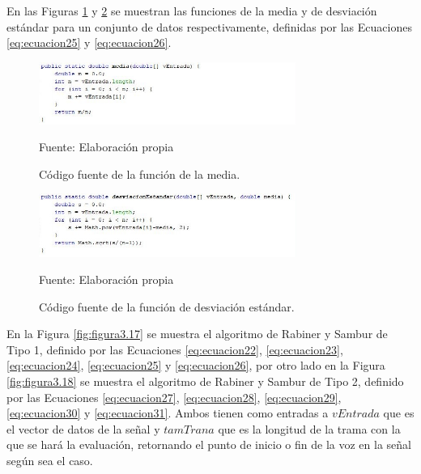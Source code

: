 \begin{enumerate}
En las Figuras \ref{fig:figura3.15} y \ref{fig:figura3.16} se muestran las funciones de la media y de desviación estándar para un conjunto de datos respectivamente, definidas por las Ecuaciones \eqref{eq:ecuacion25} y \eqref{eq:ecuacion26}.
\begin{figure}[H]
\captionsetup{justification=centering}
\begin{center}
\includegraphics[width=0.75\textwidth]{Imagenes/Cap3/image015}
\end{center}
\begin{center}
\vskip -0.5cm
\caption{\small{Código fuente de la función de la media.}}
\label{fig:figura3.15}
{\small{Fuente: Elaboración propia}}
\end{center}
\end{figure}

\begin{figure}[H]
\captionsetup{justification=centering}
\begin{center}
\includegraphics[width=0.75\textwidth]{Imagenes/Cap3/image016}
\end{center}
\begin{center}
\vskip -0.5cm
\caption{\small{Código fuente de la función de desviación estándar.}}
\label{fig:figura3.16}
{\small{Fuente: Elaboración propia}}
\end{center}
\end{figure}
\vskip -0.2cm
En la Figura \ref{fig:figura3.17} se muestra el algoritmo de Rabiner y Sambur de Tipo 1, definido por las Ecuaciones \eqref{eq:ecuacion22}, \eqref{eq:ecuacion23}, \eqref{eq:ecuacion24}, \eqref{eq:ecuacion25} y \eqref{eq:ecuacion26}, por otro lado en la Figura \ref{fig:figura3.18} se muestra el algoritmo de Rabiner y Sambur de Tipo 2, definido por las Ecuaciones \eqref{eq:ecuacion27}, \eqref{eq:ecuacion28}, \eqref{eq:ecuacion29}, \eqref{eq:ecuacion30} y \eqref{eq:ecuacion31}. Ambos tienen como entradas a $vEntrada$ que es el vector de datos de la señal y $tamTrana$ que es la longitud de la trama con la que se hará la evaluación, retornando el punto de inicio o fin de la voz en la señal según sea el caso.


\end{enumerate}
